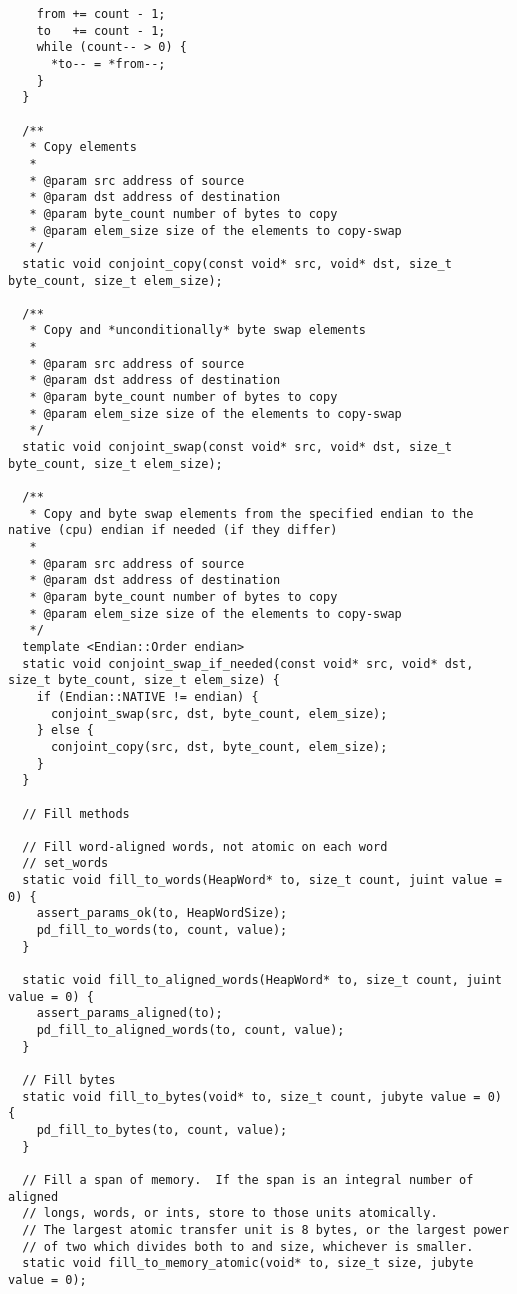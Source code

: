 \begin{itemize}
\begin{verbatim}
    from += count - 1;
    to   += count - 1;
    while (count-- > 0) {
      *to-- = *from--;
    }
  }

  /**
   * Copy elements
   *
   * @param src address of source
   * @param dst address of destination
   * @param byte_count number of bytes to copy
   * @param elem_size size of the elements to copy-swap
   */
  static void conjoint_copy(const void* src, void* dst, size_t byte_count, size_t elem_size);

  /**
   * Copy and *unconditionally* byte swap elements
   *
   * @param src address of source
   * @param dst address of destination
   * @param byte_count number of bytes to copy
   * @param elem_size size of the elements to copy-swap
   */
  static void conjoint_swap(const void* src, void* dst, size_t byte_count, size_t elem_size);

  /**
   * Copy and byte swap elements from the specified endian to the native (cpu) endian if needed (if they differ)
   *
   * @param src address of source
   * @param dst address of destination
   * @param byte_count number of bytes to copy
   * @param elem_size size of the elements to copy-swap
   */
  template <Endian::Order endian>
  static void conjoint_swap_if_needed(const void* src, void* dst, size_t byte_count, size_t elem_size) {
    if (Endian::NATIVE != endian) {
      conjoint_swap(src, dst, byte_count, elem_size);
    } else {
      conjoint_copy(src, dst, byte_count, elem_size);
    }
  }

  // Fill methods

  // Fill word-aligned words, not atomic on each word
  // set_words
  static void fill_to_words(HeapWord* to, size_t count, juint value = 0) {
    assert_params_ok(to, HeapWordSize);
    pd_fill_to_words(to, count, value);
  }

  static void fill_to_aligned_words(HeapWord* to, size_t count, juint value = 0) {
    assert_params_aligned(to);
    pd_fill_to_aligned_words(to, count, value);
  }

  // Fill bytes
  static void fill_to_bytes(void* to, size_t count, jubyte value = 0) {
    pd_fill_to_bytes(to, count, value);
  }

  // Fill a span of memory.  If the span is an integral number of aligned
  // longs, words, or ints, store to those units atomically.
  // The largest atomic transfer unit is 8 bytes, or the largest power
  // of two which divides both to and size, whichever is smaller.
  static void fill_to_memory_atomic(void* to, size_t size, jubyte value = 0);


\end{verbatim}
\end{itemize}
